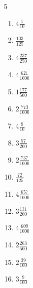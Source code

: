 \documentclass[12pt]{article}
\begin{document}
\begin{multicols}{5}
\begin{enumerate}
		\item $ 4 \frac{1}{10} $
		\item $ \frac{103}{125} $
		\item $ 4 \frac{237}{250} $
		\item $ 4 \frac{621}{1000} $
		\item $ 1 \frac{177}{500} $
		\item $ 2 \frac{773}{1000} $
		\item $ 4 \frac{9}{10} $
		\item $ 3 \frac{57}{200} $
		\item $ 2 \frac{737}{1000} $
		\item $ \frac{72}{125} $
		\item $ 4 \frac{657}{1000} $
		\item $ 3 \frac{131}{200} $
		\item $ 4 \frac{609}{1000} $
		\item $ 2 \frac{263}{500} $
		\item $ 2 \frac{39}{100} $
		\item $ 3 \frac{9}{100} $
	\end{enumerate}\end{multicols}\newpage
\end{document}
